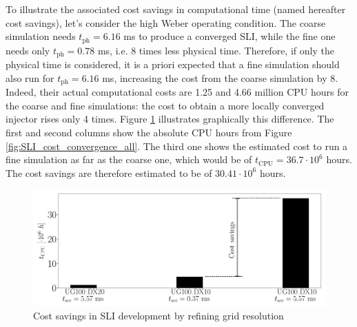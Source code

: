 To illustrate the associated cost savings in computational time (named hereafter cost savings), let's consider the high Weber operating condition. The coarse simulation needs $t_\mathrm{ph} = 6.16$ ms to produce a converged SLI, while the fine one needs only $t_\mathrm{ph} = 0.78$ ms, i.e. 8 times less physical time. Therefore, if only the physical time is considered, it is a priori expected that a fine simulation should also run for $t_\mathrm{ph} = 6.16$ ms, increasing the cost from the coarse simulation by 8. Indeed, their actual computational costs are 1.25 and 4.66 million CPU hours for the coarse and fine simulations: the cost to obtain a more locally converged injector rises only 4 times. Figure \ref{fig:SLI_cost_convergence_savings} illustrates graphically this difference. The first and second columns show the absolute CPU hours from Figure \ref{fig:SLI_cost_convergence_all}. The third one shows the estimated cost to run a fine simulation as far as the coarse one, which would be of $t_\mathrm{CPU} = 36.7 \cdot 10^6$ hours. The cost savings are therefore estimated to be of $30.41 \cdot 10^6$ hours.

\begin{figure}[ht]
   \centering
   \includegraphics[scale=0.215]{./part2_developments/figures_ch5_resolved_JICF/SLI_cost_for_convergence/cost_savings_simulations}
   \caption{Cost savings in SLI development by refining grid resolution}
   \label{fig:SLI_cost_convergence_savings}
\end{figure}

 

